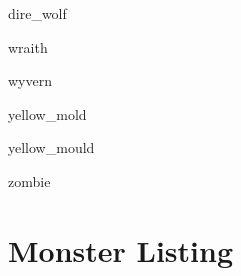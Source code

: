 \documentclass[letterpaper,serif]{module}
\begin{document}
\begin{newmonster}{dire_wolf}\end{newmonster}

\begin{newmonster}{wraith}\end{newmonster}

\begin{newmonster}{wyvern}\end{newmonster}

\begin{newmonster}{yellow_mold}\end{newmonster}

\begin{newmonster}{yellow_mould}\end{newmonster}

\begin{newmonster}{zombie}\end{newmonster}

\onecolumn

\section*{Monster Listing}
\label{wanderingmonsters}

\begin{wanderingmonsters}
\end{wanderingmonsters}

\twocolumn

\tableofcontents
\end{document}
